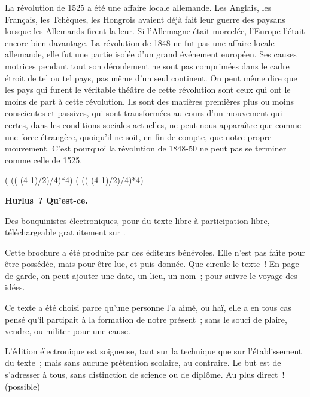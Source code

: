 \documentclass[french,twoside]{book} %
\newcommand\chapterclose{} %
\def\truncdiv#1#2{((#1-(#2-1)/2)/#2)}
\def\moduloop#1#2{(#1-\truncdiv{#1}{#2}*#2)}
\def\modulo#1#2{\number\numexpr\moduloop{#1}{#2}\relax}
\begin{document}
La révolution de 1525 a été une affaire locale allemande. Les Anglais, les Français, les Tchèques, les Hongrois avaient déjà fait leur guerre des paysans lorsque les Allemands firent la leur. Si l’Allemagne était morcelée, l’Europe l’était encore bien davantage. La révolution de 1848 ne fut pas une affaire locale allemande, elle fut une partie isolée d’un grand événement européen. Ses causes motrices pendant tout son déroulement ne sont pas comprimées dans le cadre étroit de tel ou tel pays, pas même d’un seul continent. On peut même dire que les pays qui furent le véritable théâtre de cette révolution sont ceux qui ont le moins de part à cette révolution. Ils sont des matières premières plus ou moins conscientes et passives, qui sont transformées au cours d’un mouvement qui certes, dans les conditions sociales actuelles, ne peut nous apparaître que comme une force étrangère, quoiqu’il ne soit, en fin de compte, que notre propre mouvement. C’est pourquoi la révolution de 1848-50 ne peut pas se terminer comme celle de 1525.
\chapterclose

 


\ifbooklet
  \pagestyle{empty}
  \clearpage
  \ifnum\modulo{\value{page}}{4}=0 \hbox{}\newpage\hbox{}\newpage\fi
  \ifnum\modulo{\value{page}}{4}=1 \hbox{}\newpage\hbox{}\newpage\fi


  \hbox{}\newpage
  \ifodd\value{page}\hbox{}\newpage\fi
  {\centering\color{rubric}\bfseries\noindent\large
    Hurlus ? Qu’est-ce.\par
    \bigskip
  }
  \noindent Des bouquinistes électroniques, pour du texte libre à participation libre,
  téléchargeable gratuitement sur \href{https://hurlus.fr}{}.\par
  \bigskip
  \noindent Cette brochure a été produite par des éditeurs bénévoles.
  Elle n’est pas faîte pour être possédée, mais pour être lue, et puis donnée.
  Que circule le texte !
  En page de garde, on peut ajouter une date, un lieu, un nom ; pour suivre le voyage des idées.
  \par

  Ce texte a été choisi parce qu’une personne l’a aimé,
  ou haï, elle a en tous cas pensé qu’il partipait à la formation de notre présent ;
  sans le souci de plaire, vendre, ou militer pour une cause.
  \par

  L’édition électronique est soigneuse, tant sur la technique
  que sur l’établissement du texte ; mais sans aucune prétention scolaire, au contraire.
  Le but est de s’adresser à tous, sans distinction de science ou de diplôme.
  Au plus direct ! (possible)
  \par
\end{document}
